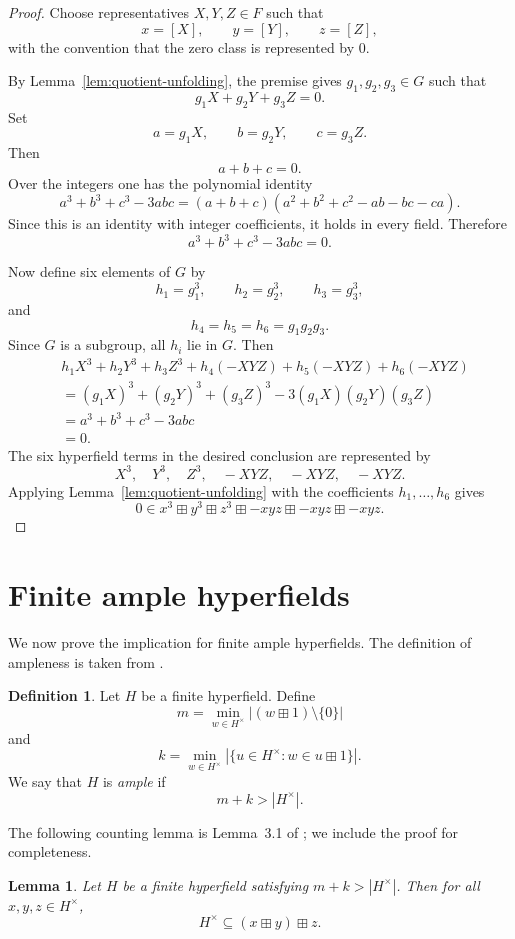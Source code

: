 \documentclass[12pt]{article}
\newtheorem{lemma}[theorem]{Lemma}
\theoremstyle{definition}
\newtheorem{definition}[theorem]{Definition}
\theoremstyle{remark}
\numberwithin{equation}{section}
\begin{document}
\begin{proof}
Choose representatives \(X,Y,Z\in F\) such that
\[
x=[X],\qquad y=[Y],\qquad z=[Z],
\]
with the convention that the zero class is represented by \(0\).

By Lemma~\ref{lem:quotient-unfolding}, the premise gives \(g_1,g_2,g_3\in G\) such that
\[
g_1X+g_2Y+g_3Z=0.
\]
Set
\[
a=g_1X,\qquad b=g_2Y,\qquad c=g_3Z.
\]
Then
\[
a+b+c=0.
\]
Over the integers one has the polynomial identity
\[
a^3+b^3+c^3-3abc
=
(a+b+c)(a^2+b^2+c^2-ab-bc-ca).
\]
Since this is an identity with integer coefficients, it holds in every field. Therefore
\[
a^3+b^3+c^3-3abc=0.
\]

Now define six elements of \(G\) by
\[
h_1=g_1^3,\qquad h_2=g_2^3,\qquad h_3=g_3^3,
\]
and
\[
h_4=h_5=h_6=g_1g_2g_3.
\]
Since \(G\) is a subgroup, all \(h_i\) lie in \(G\). Then
\[
\begin{aligned}
&h_1X^3+h_2Y^3+h_3Z^3
+h_4(-XYZ)+h_5(-XYZ)+h_6(-XYZ)\\
&=(g_1X)^3+(g_2Y)^3+(g_3Z)^3
-3(g_1X)(g_2Y)(g_3Z)\\
&=a^3+b^3+c^3-3abc\\
&=0.
\end{aligned}
\]
The six hyperfield terms in the desired conclusion are represented by
\[
X^3,\quad Y^3,\quad Z^3,\quad -XYZ,\quad -XYZ,\quad -XYZ.
\]
Applying Lemma~\ref{lem:quotient-unfolding} with the coefficients \(h_1,\dots,h_6\) gives
\[
0\in x^3\boxplus y^3\boxplus z^3\boxplus -xyz\boxplus -xyz\boxplus -xyz.
\]
\end{proof}

\section{Finite ample hyperfields}\label{sec:ample}

We now prove the implication for finite ample hyperfields. The definition of ampleness is taken from \cite{ample}.

\begin{definition}
Let \(H\) be a finite hyperfield. Define
\[
m=\min_{w\in H^\times} |(w\boxplus1)\setminus\{0\}|
\]
and
\[
k=\min_{w\in H^\times} |\{u\in H^\times:w\in u\boxplus1\}|.
\]
We say that \(H\) is \emph{ample} if
\[
m+k>|H^\times|.
\]
\end{definition}

The following counting lemma is Lemma~3.1 of \cite{ample}; we include the proof for completeness.

\begin{lemma}\label{lem:counting}
Let \(H\) be a finite hyperfield satisfying \(m+k>|H^\times|\). Then for all \(x,y,z\in H^\times\),
\[
H^\times\subseteq (x\boxplus y)\boxplus z.
\]
\end{lemma}
\end{document}
